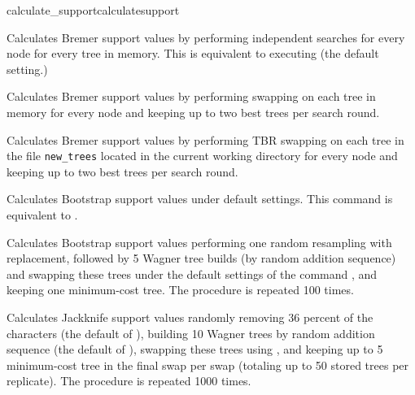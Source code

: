 \begin{command}{calculate\_support}{calculatesupport}
	\begin{poyexamples} 

            {Calculates Bremer support values by performing
            independent searches for every node for every tree in memory. This is equivalent to executing  (the default setting.)}
         
            {Calculates Bremer support values by performing swapping on 
            each tree in memory for every node and keeping up to two
            best trees per search round.}
          
            {Calculates Bremer support values by performing TBR swapping on 
            each tree in the file \texttt{new\_trees} located in the current
            working directory for every node and keeping up to two
            best trees per search round.}  
            
         {Calculates Bootstrap support values under default settings. This command
         is equivalent to .}
	
            {Calculates Bootstrap support values performing one random resampling with
            replacement, followed by 5 Wagner tree builds (by random addition sequence)
            and swapping these trees under the default settings of the command 
            , and keeping one minimum-cost tree. The procedure
            is repeated 100 times.}
        
            {Calculates Jackknife support values randomly removing 36 percent of the
            characters (the default of ), building 10
            Wagner trees by random addition sequence (the default of
            ), swapping these trees using ,
            and keeping up to 5 minimum-cost tree in the
            final swap per swap (totaling up to 50 stored trees per replicate). 
            The procedure is repeated 1000 times.}

	\end{poyexamples}
            
	\begin{poyalso}
	\end{poyalso}

\end{command}

